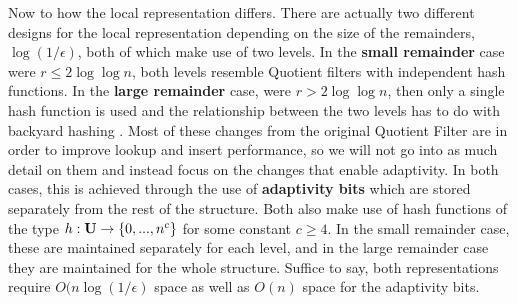 \documentclass[../paper.tex]{subfiles}
\begin{document}
    Now to how the local representation differs.  There are actually two
    different designs for the local representation depending on the size of the
    remainders, $\log(1/\epsilon)$, both of which make use of two levels.   In
    the {\bf small remainder} case were $r \leq 2 \log\log n$, both levels
    resemble Quotient filters with independent hash functions.  In the {\bf
    large remainder} case, were $ r > 2 \log\log n$, then only a single hash
    function is used and the relationship between the two levels has to do with
    backyard hashing \cite{backyard-hashing}.  Most of these changes from the
    original Quotient Filter are in order to improve lookup and insert
    performance, so we will not go into as much detail on them and instead
    focus on the changes that enable adaptivity.  In both cases, this is
    achieved through the use of {\bf adaptivity bits} which are stored
    separately from the rest of the structure.  Both also make use of hash
    functions of the type $h : {\bf U} \rightarrow \{0, ..., n^c\}$ for some
    constant $c \geq 4$.  In the small remainder case, these are maintained
    separately for each level, and in the large remainder case they are
    maintained for the whole structure.  Suffice to say, both representations
    require $O(n\log(1/\epsilon)$ space as well as $O(n)$ space for the
    adaptivity bits.  
	
\end{document}
